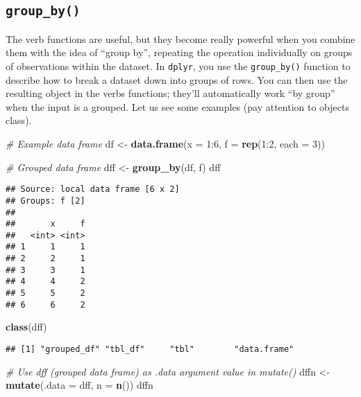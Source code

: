 \documentclass[]{book}
\newenvironment{Shaded}{\begin{snugshade}}{\end{snugshade}}
\newcommand{\KeywordTok}[1]{\textcolor[rgb]{0.13,0.29,0.53}{\textbf{{#1}}}}
\newcommand{\DataTypeTok}[1]{\textcolor[rgb]{0.13,0.29,0.53}{{#1}}}
\newcommand{\DecValTok}[1]{\textcolor[rgb]{0.00,0.00,0.81}{{#1}}}
\newcommand{\StringTok}[1]{\textcolor[rgb]{0.31,0.60,0.02}{{#1}}}
\newcommand{\CommentTok}[1]{\textcolor[rgb]{0.56,0.35,0.01}{\textit{{#1}}}}
\newcommand{\NormalTok}[1]{{#1}}
\begin{document}
\subsection{\texorpdfstring{\texttt{group\_by()}}{group\_by()}}\label{group_by}

The verb functions are useful, but they become really powerful when you
combine them with the idea of ``group by'', repeating the operation
individually on groups of observations within the dataset. In
\texttt{dplyr}, you use the \texttt{group\_by()} function to describe
how to break a dataset down into groups of rows. You can then use the
resulting object in the verbs functions; they'll automatically work ``by
group'' when the input is a grouped. Let us see some examples (pay
attention to objects class).

\begin{Shaded}
\begin{Highlighting}[]
\CommentTok{# Example data frame}
\NormalTok{df <-}\StringTok{ }\KeywordTok{data.frame}\NormalTok{(}\DataTypeTok{x =} \DecValTok{1}\NormalTok{:}\DecValTok{6}\NormalTok{, }\DataTypeTok{f =} \KeywordTok{rep}\NormalTok{(}\DecValTok{1}\NormalTok{:}\DecValTok{2}\NormalTok{, }\DataTypeTok{each =} \DecValTok{3}\NormalTok{))}

\CommentTok{# Grouped data frame}
\NormalTok{dff <-}\StringTok{ }\KeywordTok{group_by}\NormalTok{(df, f)}
\NormalTok{dff}
\end{Highlighting}
\end{Shaded}

\begin{verbatim}
## Source: local data frame [6 x 2]
## Groups: f [2]
## 
##       x     f
##   <int> <int>
## 1     1     1
## 2     2     1
## 3     3     1
## 4     4     2
## 5     5     2
## 6     6     2
\end{verbatim}

\begin{Shaded}
\begin{Highlighting}[]
\KeywordTok{class}\NormalTok{(dff)}
\end{Highlighting}
\end{Shaded}

\begin{verbatim}
## [1] "grouped_df" "tbl_df"     "tbl"        "data.frame"
\end{verbatim}

\begin{Shaded}
\begin{Highlighting}[]
\CommentTok{# Use dff (grouped data frame) as .data argument value in mutate() }
\NormalTok{dffn <-}\StringTok{ }\KeywordTok{mutate}\NormalTok{(}\DataTypeTok{.data =} \NormalTok{dff, }\DataTypeTok{n =} \KeywordTok{n}\NormalTok{())}
\NormalTok{dffn}
\end{Highlighting}
\end{Shaded}
\end{document}
